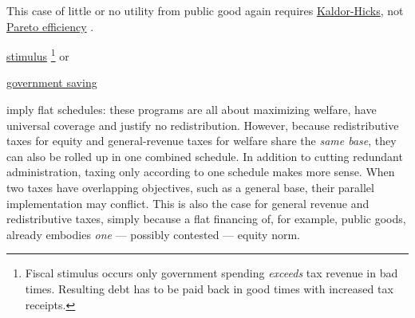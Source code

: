 \begin{description}
\begin{inparaenum}
{			This case of little or no utility from public good again requires \hyperref[sec:kaldor-hicks]{Kaldor-Hicks}, not \hyperref[sec:pareto]{Pareto efficiency} \citep{Kaldor1939,Hicks1939}.
		}


		\item \hyperref[sec:fiscal-stimulus]{stimulus}
		\footnote{
			Fiscal stimulus occurs only government spending \emph{exceeds} tax revenue in bad times.
			Resulting debt has to be paid back in good times with increased tax receipts.
		}
		or

		\item \hyperref[sec:government-saves]{government saving}
	\end{inparaenum}
	imply flat schedules:
	these programs are all about maximizing welfare, have universal coverage and justify no redistribution.
	However,
		\label{sec:fiscal-redistribution-and-revenue-are-one}
	because redistributive taxes for equity and general-revenue taxes for welfare share the \emph{same base}, they can also be rolled up in one combined schedule.
	In addition to cutting redundant administration, taxing only according to one schedule makes more sense.
	When two taxes have overlapping objectives, such as a general base, their parallel implementation may conflict.
	This is also the case for general revenue and redistributive taxes, simply because a flat financing of, for example, public goods, already embodies \emph{one} --- possibly contested --- equity norm.
\end{description}


